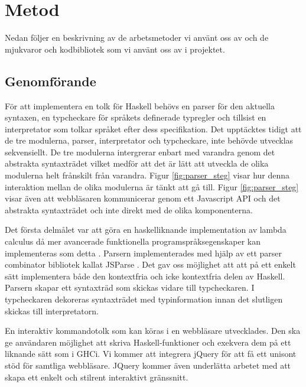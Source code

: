 \section{Metod} 

Nedan följer en beskrivning av de arbetsmetoder vi använt oss av och de mjukvaror och kodbibliotek som vi använt oss av i projektet. 

\subsection{Genomförande}

För att implementera en tolk för Haskell behövs en parser för den aktuella syntaxen, en typcheckare för språkets definerade typregler och tillsist en interpretator som tolkar språket efter dess specifikation.
Det upptäcktes tidigt att de tre modulerna, parser, interpretator och typcheckare, inte behövde utvecklas sekvensiellt. De tre modulerna intergrerar enbart med varandra genom det abstrakta syntaxträdet vilket medför att det är lätt att utveckla de olika modulerna helt frånskilt från varandra. Figur \ref{fig:parser_steg} visar hur denna interaktion mellan de olika modulerna är tänkt att gå till. Figur \ref{fig:parser_steg} visar även att webbläsaren kommunicerar genom ett Javascript API och det abstrakta syntaxträdet och inte direkt med de olika komponenterna. 

Det första delmålet var att göra en haskelliknande implementation av lambda calculus då mer avancerade funktionella programspråksegenskaper kan implementeras som detta \citep{jones87}.
Parsern implementerades med hjälp av ett parser combinator bibliotek kallat JSParse \citep{jsparse}. Det gav oss möjlighet att att på ett enkelt sätt implementera både den kontextfria och icke kontextfria delen av Haskell. Parsern skapar ett syntaxträd som skickas vidare till typcheckaren. I typcheckaren dekoreras syntaxträdet med typinformation innan det slutligen skickas till interpretatorn.

En interaktiv kommandotolk som kan köras i en webbläsare utvecklades. Den ska ge användaren möjlighet att skriva Haskell-funktioner och exekvera dem på ett liknande sätt som i GHCi. 
Vi kommer att integrera jQuery \citep{jquery} för att få ett unisont stöd för samtliga webbläsare. JQuery kommer även underlätta arbetet med att skapa ett enkelt och stilrent interaktivt gränssnitt.



